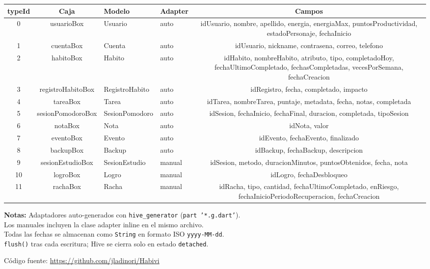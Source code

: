 \documentclass[11pt]{article}
\begin{document}
\centering

\begin{tcolorbox}[
  width=\textwidth,
  colback=cframe,
  colframe=cacc,
  arc=6pt,
  title={\huge \textbf{Habivi}~~---~~Diseño de Base de Datos Local (Hive)},
  fonttitle=\color{white}\bfseries\large,
  left=8pt, right=8pt, top=6pt, bottom=6pt
]

\small
\begin{tabular}{ccllc}
\toprule
\rowcolor{chead}
\textbf{typeId} & \textbf{Caja} & \textbf{Modelo} & \textbf{Adapter} & \textbf{Campos} \\
\midrule
0  & usuarioBox      & Usuario        & auto       & idUsuario, nombre, apellido, energia, energiaMax, puntosProductividad, estadoPersonaje, fechaInicio \\
1  & cuentaBox       & Cuenta         & auto       & idUsuario, nickname, contrasena, correo, telefono \\
2  & habitoBox       & Habito         & auto       & idHabito, nombreHabito, atributo, tipo, completadoHoy, fechaUltimoCompletado, fechasCompletadas, vecesPorSemana, fechaCreacion \\
3  & registroHabitoBox & RegistroHabito & auto     & idRegistro, fecha, completado, impacto \\
4  & tareaBox        & Tarea          & auto       & idTarea, nombreTarea, puntaje, metadata, fecha, notas, completada \\
5  & sesionPomodoroBox & SesionPomodoro & auto     & idSesion, fechaInicio, fechaFinal, duracion, completada, tipoSesion \\
6  & notaBox         & Nota           & auto       & idNota, valor \\
7  & eventoBox       & Evento         & auto       & idEvento, fechaEvento, finalizado \\
8  & backupBox       & Backup         & auto       & idBackup, fechaBackup, descripcion \\
9  & sesionEstudioBox & SesionEstudio  & manual     & idSesion, metodo, duracionMinutos, puntosObtenidos, fecha, nota \\
10 & logroBox        & Logro          & manual     & idLogro, fechaDesbloqueo \\
11 & rachaBox        & Racha          & manual     & idRacha, tipo, cantidad, fechaUltimoCompletado, enRiesgo, fechaInicioPeriodoRecuperacion, fechaCreacion \\
\bottomrule
\end{tabular}

\vspace{0.3cm}
{\footnotesize
\textbf{Notas:} Adaptadores auto-generados con \texttt{hive\_generator} (\texttt{part '*.g.dart'}).\\
Los manuales incluyen la clase adapter inline en el mismo archivo.\\
Todas las fechas se almacenan como \texttt{String} en formato ISO \texttt{yyyy-MM-dd}.\\
\texttt{flush()} tras cada escritura; Hive se cierra solo en estado \texttt{detached}.
}

\end{tcolorbox}

\vspace{0.15cm}
{\tiny\color{gray}Código fuente: \url{https://github.com/jladinori/Habivi}}
\end{document}
